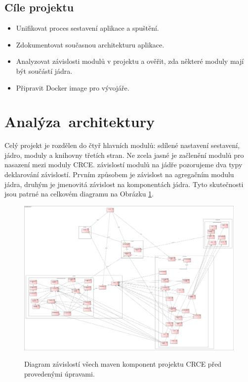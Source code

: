 \documentclass[12pt, a4paper]{article}
\begin{document}
\subsection{Cíle projektu}

\begin{itemize}
	\item Unifikovat proces sestavení aplikace a spuštění.
	\item Zdokumentovat současnou architekturu aplikace.
	\item Analyzovat závislosti modulů v projektu a ověřit, zda některé moduly mají být součástí jádra.
	\item Připravit Docker image pro vývojáře.
\end{itemize}

\newpage
\section{Analýza~architektury} %

Celý projekt je rozdělen do čtyř hlavních modulů: sdílené nastavení sestavení, jádro, moduly a knihovny třetích stran. Ne zcela jasné je začlenění modulů pro nasazení mezi moduly CRCE. závislostí modulů na jádře pozorujeme dva typy deklarování závislostí. Prvním způsobem je závislost na agregačním modulu jádra, druhým je jmenovitá závislost na komponentách jádra. Tyto skutečnosti jsou patrné na celkovém diagramu na Obrázku \ref{fig:wholeCRCE}.

\begin{figure}[h!]
\centering
\includegraphics[width=135mm]{wholeCRCE.png}
\label{fig:wholeCRCE}
\caption{Diagram závislostí všech maven komponent projektu CRCE před provedenými úpravami.}
\end{figure}
\end{document}
